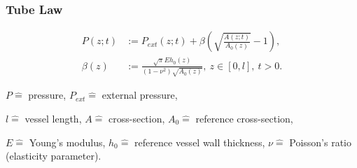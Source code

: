 \documentclass{beamer}
\begin{document}
	\begin{frame}
		\frametitle{Tube Law}
		\begin{align}
			P(z;t) &:= P_{ext}(z;t) + \beta \left( \sqrt{\frac{A(z;t)}{A_0(z)}}-1 \right),      \label{eq:p_tot}\\
			\beta(z) &:=  \frac{\sqrt{\pi} E h_0(z)}{(1-\nu^2) \sqrt{A_0(z)}},\  z \in \left[ 0,l \right], \ t > 0. 
		\end{align}

		\vfill

		{\tiny \centering 
			$P \hat{=}$ pressure,
			$P_{ext} \hat{=}$ external pressure,

			$l \hat{=}$ vessel length,
			$A \hat{=}$ cross-section,
			$A_0 \hat{=}$ reference cross-section,

			$E \hat{=}$ Young's modulus,
			$h_0 \hat{=}$ reference vessel wall thickness,
			$\nu \hat{=}$ Poisson's ratio (elasticity parameter). 
		\par}

	\end{frame}
\end{document}
